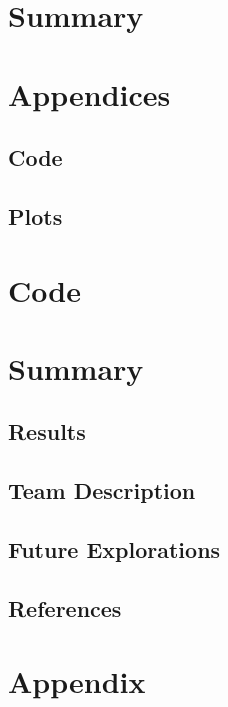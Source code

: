 \documentclass[11pt]{article}
\begin{document}
\section{Summary}

\section{Appendices}

\subsection{Code}

\subsection{Plots}





\section{Code}

\section{Summary}
\subsection{Results}


\subsection{Team Description}


\subsection{Future Explorations}


\subsection{References}

\section*{Appendix}
\end{document}
